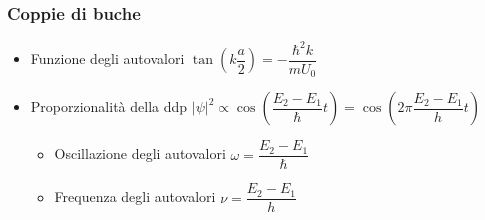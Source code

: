 \documentclass{article}
\begin{document}
\subsubsection{Coppie di buche}
\begin{itemize}
  \item Funzione degli autovalori \( \tan\left( k \dfrac{a}{2} \right) = - \dfrac{\hbar ^2 k}{m U_0} \)
  \item Proporzionalità della ddp \( | \psi | ^ 2 \propto \cos \left( \dfrac{E_2 - E_1}{\hbar} t \right) = \cos \left( 2 \pi \dfrac{E_2 - E_1}{h} t \right)  \)
        \begin{itemize}
          \item Oscillazione degli autovalori \( \omega = \dfrac{E_2 - E_1}{\hbar} \)
          \item Frequenza degli autovalori \( \nu = \dfrac{E_2 - E_1}{h} \)
        \end{itemize}
\end{itemize}
\end{document}
